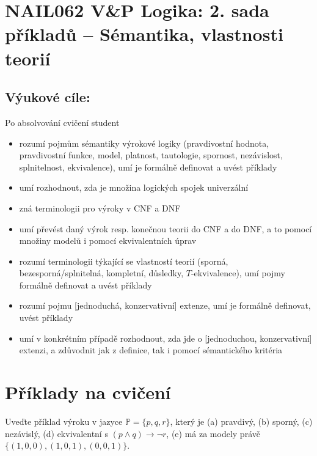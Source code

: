 \section*{NAIL062 V\&P Logika: 2. sada příkladů -- Sémantika, vlastnosti teorií}

\subsection*{Výukové cíle:} Po absolvování cvičení student

    \begin{itemize}\setlength{\itemsep}{0pt}
        \item rozumí pojmům sémantiky výrokové logiky (pravdivostní hodnota, pravdivostní funkce, model, platnost, tautologie, spornost, nezávislost, splnitelnost, ekvivalence), umí je formálně definovat a uvést příklady
        \item umí rozhodnout, zda je množina logických spojek univerzální
        \item zná terminologii pro výroky v CNF a DNF %
        \item umí převést daný výrok resp. konečnou teorii do CNF a do DNF, a to pomocí množiny modelů i pomocí ekvivalentních úprav
        \item rozumí terminologii týkající se vlastností teorií (sporná, bezesporná/splnitelná, kompletní, důsledky, $T$-ekvivalence), umí pojmy formálně definovat a uvést příklady
        \item rozumí pojmu [jednoduchá, konzervativní] extenze, umí je formálně definovat, uvést příklady
        \item umí v konkrétním případě rozhodnout, zda jde o [jednoduchou, konzervativní] extenzi, a zdůvodnit jak z definice, tak i pomocí sémantického kritéria
    \end{itemize}


\section*{Příklady na cvičení}


\begin{problem}

    Uveďte příklad výroku v jazyce $\mathbb P=\{p,q,r\}$, který je (a) pravdivý, (b) sporný, (c) nezávislý, (d) ekvivalentní s $(p\wedge q)\to\neg r$, (e) má za modely právě $\{(1,0,0),(1,0,1),(0,0,1)\}$.


    \begin{solution}
            
    \end{solution}

\end{problem}


